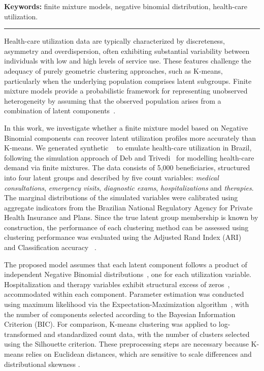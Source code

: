 \documentclass[11pt]{article}
\begin{document}
\noindent\textbf{Keywords:} finite mixture models, negative binomial
distribution, health-care utilization.

\noindent\rule{\textwidth}{0.4pt}

Health-care utilization data are typically characterized by discreteness,
asymmetry and overdispersion, often exhibiting substantial variability
between individuals with low and high levels of service use.
These features challenge the adequacy of purely geometric clustering
approaches, such as K-means, particularly when the underlying population
comprises latent subgroups.
Finite mixture models provide a probabilistic framework for representing
unobserved heterogeneity by assuming that the observed population arises
from a combination of latent components~\cite{mclachlan2000finite,ng2019mixture}.

In this work, we investigate whether a finite mixture model based on
Negative Binomial components can recover latent utilization profiles more
accurately than K-means.
We generated synthetic ~\cite{tucker2020generating} to emulate
health-care utilization in Brazil, following the simulation
approach of Deb and Trivedi~\cite{deb1997demand} for modelling health-care
demand via finite mixtures.
The data consists of 5,000 beneficiaries, structured into four latent
groups and described by five count variables: \textit{medical consultations}, 
\textit{emergency visits}, \textit{diagnostic exams}, \textit{hospitalizations} 
and \textit{therapies}.
The marginal distributions of the simulated variables were calibrated using
aggregate indicators from the Brazilian National Regulatory Agency for
Private Health Insurance and Plans.
Since the true latent group membership is known by construction, the
performance of each clustering method can be assessed using clustering performance was evaluated using the Adjusted Rand Index (ARI) ~\cite{hubert1985comparing} and Classification accuracy ~\cite{munkres1957algorithms}.

The proposed model assumes that each latent component follows a product
of independent Negative Binomial distributions~\cite{cameron2013regression},
one for each utilization variable.
Hospitalization and therapy variables exhibit structural excess of
zeros~\cite{lambert1992zero}, accommodated within each component.
Parameter estimation was conducted using maximum likelihood via the Expectation-Maximization
algorithm~\cite{dempster1977maximum}, with the number of components selected
according to the Bayesian Information Criterion (BIC).
For comparison, K-means clustering was applied to log-transformed and
standardized count data, with the number of clusters selected using the
Silhouette criterion. These preprocessing steps are necessary because
K-means relies on Euclidean distances, which are sensitive to scale
differences and distributional skewness \cite{hastie2009elements}.
\end{document}
